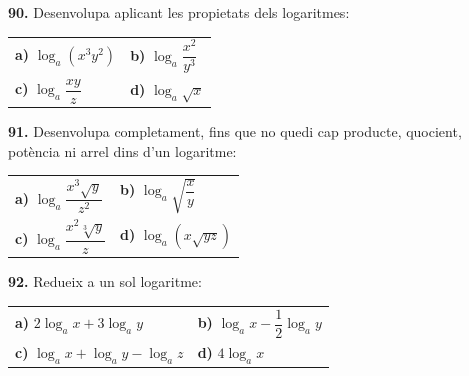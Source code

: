\documentclass[13pt,a4paper]{extarticle}
\begin{document}
\par\noindent\begin{minipage}{\linewidth}
\textbf{90.} Desenvolupa aplicant les propietats dels logaritmes:\par

\begin{tabular}{@{}p{.46\linewidth}p{.46\linewidth}@{}}
\textbf{a)} $\log_a\left(x^3 y^2\right)$ & \textbf{b)} $\log_a \dfrac{x^2}{y^3}$ \\[2pt]
\textbf{c)} $\log_a \dfrac{xy}{z}$ & \textbf{d)} $\log_a \sqrt{x}$ \\[2pt]
\end{tabular}\par
\end{minipage}\par\vspace{1.6mm}
\par\noindent\begin{minipage}{\linewidth}
\textbf{91.} Desenvolupa completament, fins que no quedi cap producte, quocient, potència ni arrel dins d'un logaritme:\par

\begin{tabular}{@{}p{.46\linewidth}p{.46\linewidth}@{}}
\textbf{a)} $\log_a \dfrac{x^3\sqrt{y}}{z^2}$ & \textbf{b)} $\log_a \sqrt{\dfrac{x}{y}}$ \\[2pt]
\textbf{c)} $\log_a \dfrac{x^2\sqrt[3]{y}}{z}$ & \textbf{d)} $\log_a \left(x\sqrt{yz}\right)$ \\[2pt]
\end{tabular}\par
\end{minipage}\par\vspace{1.6mm}
\par\noindent\begin{minipage}{\linewidth}
\textbf{92.} Redueix a un sol logaritme:\par

\begin{tabular}{@{}p{.46\linewidth}p{.46\linewidth}@{}}
\textbf{a)} $2\log_a x+3\log_a y$ & \textbf{b)} $\log_a x-\dfrac12\log_a y$ \\[2pt]
\textbf{c)} $\log_a x+\log_a y-\log_a z$ & \textbf{d)} $4\log_a x$ \\[2pt]
\end{tabular}\par
\end{minipage}\par\vspace{1.6mm}
\end{document}
